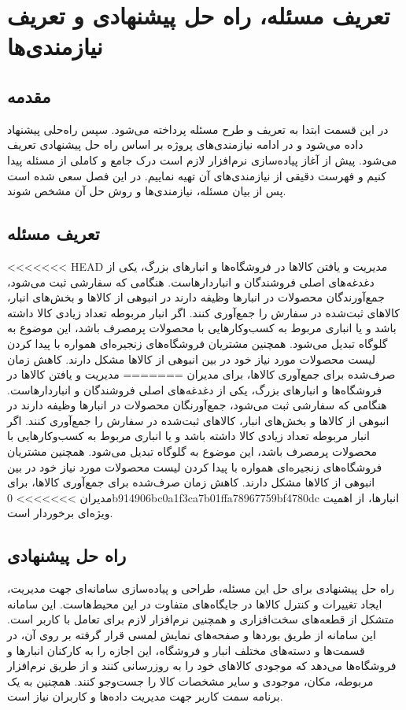 \chapter{تعریف مسئله، راه حل پیشنهادی و تعریف نیازمندی‌ها}
\section{مقدمه}
در این قسمت ابتدا به تعریف و طرح مسئله پرداخته می‌شود. سپس راه‌حلی پیشنهاد داده می‌شود و در ادامه نیازمندی‌های پروژه بر اساس راه حل پیشنهادی تعریف می‌شود.
پیش از آغاز پیاده‌سازی نرم‌افزار لازم است درک جامع و کاملی از مسئله پیدا کنیم و فهرست دقیقی از نیازمندی‌های آن تهیه نماییم. در این فصل سعی شده است پس از بیان مسئله، نیازمندی‌ها و روش حل آن مشخص شوند.

\section{تعریف مسئله}
<<<<<<< HEAD
مدیریت و یافتن کالاها در فروشگاه‌ها و انبار‌های بزرگ، یکی از دغدغه‌های اصلی فروشندگان و انباردارهاست. هنگامی که سفارشی ثبت می‌شود، جمع‌آورندگان محصولات در انبارها وظیفه دارند در انبوهی از کالاها و بخش‌های انبار، کالاهای ثبت‌شده در سفارش را جمع‌آوری کنند. اگر انبار مربوطه تعداد زیادی کالا داشته باشد و یا انباری مربوط به کسب‌و‌کارهایی با محصولات پرمصرف باشد، این موضوع به گلوگاه تبدیل می‌شود. همچنین مشتریان فروشگاه‌های زنجیره‌ای همواره با پیدا کردن لیست محصولات مورد نیاز خود در بین انبوهی از کالاها مشکل دارند. کاهش زمان صرف‌شده برای جمع‌آوری کالاها، برای مدیران 
=======
مدیریت و یافتن کالاها در فروشگاه‌ها و انبار‌های بزرگ، یکی از دغدغه‌های اصلی فروشندگان و انباردارهاست. هنگامی که سفارشی ثبت می‌شود، جمع‌آورنگان محصولات در انبارها وظیفه دارند در انبوهی از کالاها و بخش‌های انبار، کالاهای ثبت‌شده در سفارش را جمع‌آوری کنند. اگر انبار مربوطه تعداد زیادی کالا داشته باشد و یا انباری مربوط به کسب‌و‌کارهایی با محصولات پرمصرف باشد، این موضوع به گلوگاه تبدیل می‌شود. همچنین مشتریان فروشگاه‌های زنجیره‌ای همواره با پیدا کردن لیست محصولات مورد نیاز خود در بین انبوهی از کالاها مشکل دارند. کاهش زمان صرف‌شده برای جمع‌آوری کالاها، برای مدیران 
>>>>>>> 0b914906bc0a1f3ca7b01ffa78967759bf4780dc
انبارها، از اهمیت ویژه‌ای برخوردار است.


\section{راه حل پیشنهادی} 
راه حل پیشنهادی برای حل این مسئله، طراحی و پیاده‌سازی سامانه‌ای جهت مدیریت، ایجاد تغییرات و کنترل کالاها در جایگاه‌های متفاوت در این محیط‌هاست. این سامانه متشکل از قطعه‌های سخت‌افزاری و همچنین نرم‌افزار لازم برای تعامل با کاربر است. این سامانه از طریق بوردها و صفحه‌های نمایش لمسی قرار گرفته بر روی آن، در قسمت‌ها و دسته‌های مختلف انبار و فروشگاه، این اجازه را به کارکنان انبارها و فروشگاه‌ها می‌دهد که موجودی کالا‌های خود را به روز‌رسانی کنند و از طریق نرم‌افزار مربوطه، مکان، موجودی و سایر مشخصات کالا را جست‌و‌جو کنند. همچنین به یک برنامه سمت کاربر جهت مدیریت داده‌ها و کاربران نیاز است.



